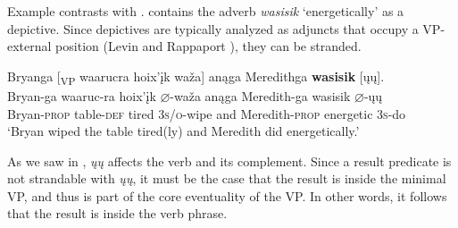 \documentclass[output=paper]{LSP/langsci}
\begin{document}
\begin{exe}
\ex\label{ex:rosen:24}
\begin{xlist}



\end{xlist}
\end{exe}

Example  contrasts with .   contains the adverb \emph{wasisik} `energetically' as a depictive. Since depictives are typically analyzed as adjuncts that occupy a VP-external position (Levin and Rappaport \citealt{Hovav1995}), they can be stranded.

\begin{exe}

\ex\label{ex:rosen:25} \glll Bryanga [\textsubscript{VP} waarucra hoix'įk waža\textsc] anąga  Meredithga \textbf{wasisik} [ųų]. \\
 Bryan-ga {} waaruc-ra hoix'įk {$\varnothing$}-waža anąga Meredith-ga  wasisik {$\varnothing$}-ųų\\
Bryan-\textsc{prop} {} table-\textsc{def} tired \textsc{3s/o}-wipe and Meredith-\textsc{prop}  energetic \textsc{3s}-do\\
\glt `Bryan wiped the table tired(ly) and Meredith did energetically.'

\end{exe}

As we saw in , \textit{ųų} affects the verb and its complement. Since a result predicate is not strandable with \textit{ųų}, it must be the case that the result is inside the minimal VP, and thus is part of the core eventuality of the VP. In other words, it follows that the result is inside the verb phrase.
\end{document}
